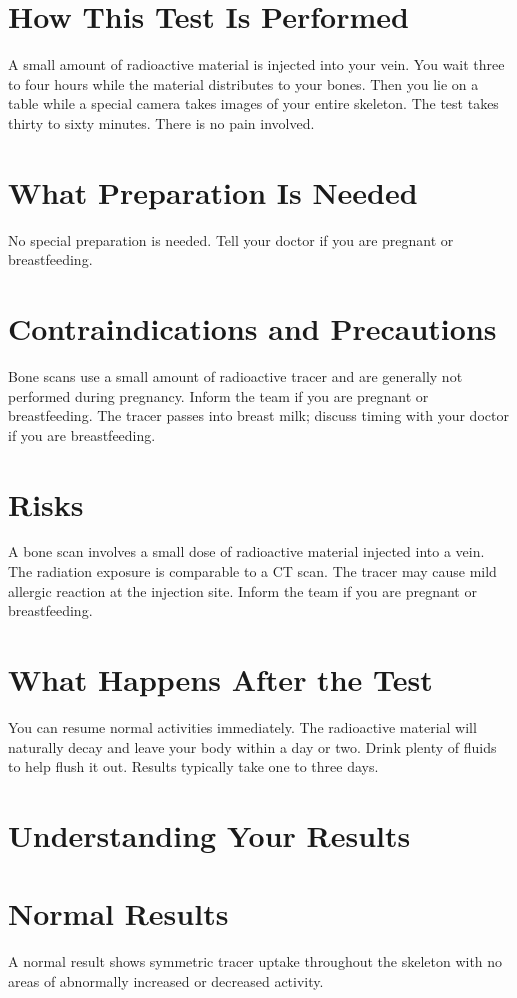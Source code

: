 \section*{How This Test Is Performed}
A small amount of radioactive material is injected into your vein. You wait three to four hours while the material distributes to your bones. Then you lie on a table while a special camera takes images of your entire skeleton. The test takes thirty to sixty minutes. There is no pain involved.

\section*{What Preparation Is Needed}
No special preparation is needed. Tell your doctor if you are pregnant or breastfeeding.

\section*{Contraindications and Precautions}
Bone scans use a small amount of radioactive tracer and are generally not performed during pregnancy. Inform the team if you are pregnant or breastfeeding. The tracer passes into breast milk; discuss timing with your doctor if you are breastfeeding.

\section*{Risks}
A bone scan involves a small dose of radioactive material injected into a vein. The radiation exposure is comparable to a CT scan. The tracer may cause mild allergic reaction at the injection site. Inform the team if you are pregnant or breastfeeding.

\section*{What Happens After the Test}
You can resume normal activities immediately. The radioactive material will naturally decay and leave your body within a day or two. Drink plenty of fluids to help flush it out. Results typically take one to three days.

\section*{Understanding Your Results}

\section*{Normal Results}
A normal result shows symmetric tracer uptake throughout the skeleton with no areas of abnormally increased or decreased activity.
\clearpage
